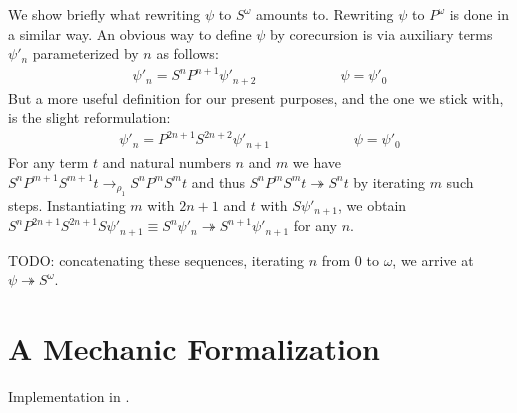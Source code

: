 We show briefly what rewriting $\psi$ to $S^\omega$ amounts
to. Rewriting $\psi$ to $P^\omega$ is done in a similar way.
An obvious way to define $\psi$ by corecursion is via auxiliary terms
$\psi'_n$ parameterized by $n$ as follows:
\begin{align*}
  \psi'_n = S^n P^{n + 1} \psi'_{n + 2} \qquad \qquad \qquad
  \psi = \psi'_0
\end{align*}
But a more useful definition for our present purposes, and the one we
stick with, is the slight reformulation:
\begin{align*}
  \psi'_n = P^{2 n + 1} S^{2 n + 2} \psi'_{n + 1} \qquad
  \qquad \qquad
  \psi = \psi'_0
\end{align*}
For any term $t$ and natural numbers $n$ and $m$ we have $S^n P^{m+1}
S^{m+1} t \rightarrow_{\rho_1} S^n P^m S^m t$ and thus $S^n P^m S^m t
\twoheadrightarrow S^n t$ by iterating $m$ such steps. Instantiating
$m$ with $2 n + 1$ and $t$ with $S \psi'_{n + 1}$, we obtain $S^n P^{2
  n + 1} S^{2 n + 1} S \psi'_{n + 1} \equiv S^n \psi'_n
\twoheadrightarrow S^{n+1} \psi'_{n + 1}$ for any $n$.

TODO: concatenating these sequences, iterating $n$ from $0$ to
$\omega$, we arrive at $\psi \twoheadrightarrow S^\omega$.


\section{A Mechanic Formalization}

Implementation in \Coq.
